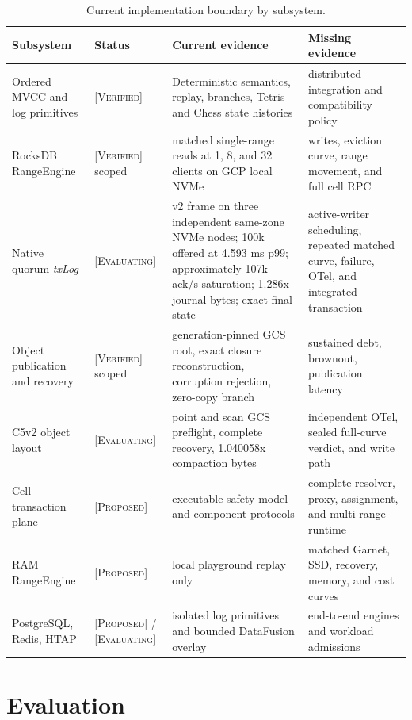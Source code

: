 \documentclass[sigconf,nonacm]{acmart}
\newcommand{\txlog}{\textit{txLog}}
\newcommand{\verified}{\textsc{[Verified]}}
\newcommand{\evaluating}{\textsc{[Evaluating]}}
\newcommand{\proposed}{\textsc{[Proposed]}}
\begin{document}
\begin{table}[t]
  \centering
  \small
  \caption{Current implementation boundary by subsystem.}
  \label{tab:implementation}
  \begin{tabularx}{\textwidth}{@{}p{}p{}X X@{}}
    \toprule
    Subsystem & Status & Current evidence & Missing evidence \\
    \midrule
    Ordered MVCC and log primitives & \verified & Deterministic semantics,
    replay, branches, Tetris and Chess state histories & distributed integration
    and compatibility policy \\
    RocksDB RangeEngine & \verified{} scoped & matched single-range reads at 1,
    8, and 32 clients on GCP local NVMe & writes, eviction curve, range movement,
    and full cell RPC \\
    Native quorum \txlog{} & \evaluating & v2 frame on three independent
    same-zone NVMe nodes; 100k offered at 4.593 ms p99; approximately 107k
    ack/s saturation; 1.286x journal bytes; exact final state & active-writer
    scheduling, repeated matched curve, failure, OTel, and integrated
    transaction \\
    Object publication and recovery & \verified{} scoped & generation-pinned GCS
    root, exact closure reconstruction, corruption rejection, zero-copy branch &
    sustained debt, brownout, publication latency \\
    C5v2 object layout & \evaluating & point and scan GCS preflight, complete
    recovery, 1.040058x compaction bytes & independent OTel, sealed full-curve
    verdict, and write path \\
    Cell transaction plane & \proposed & executable safety model and component
    protocols & complete resolver, proxy, assignment, and multi-range runtime \\
    RAM RangeEngine & \proposed & local playground replay only & matched Garnet,
    SSD, recovery, memory, and cost curves \\
    PostgreSQL, Redis, HTAP & \proposed{} / \evaluating & isolated log primitives
    and bounded DataFusion overlay & end-to-end engines and workload admissions \\
    \bottomrule
  \end{tabularx}
\end{table}

\section{Evaluation}
\end{document}
